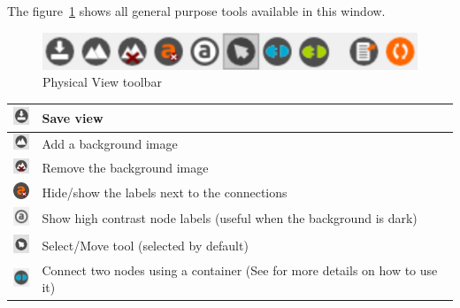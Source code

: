 \documentclass[a4paper]{article}
\begin{document}
		The figure~\ref{fig:default_view_toolbar} shows all general purpose tools available in this window.
		\begin{figure}[h!]
			\centering
			\includegraphics[width=0.6\linewidth]{img/default_view_toolbar.png}
			\caption{Physical View toolbar}
			\label{fig:default_view_toolbar}
		\end{figure}
		
		\begin{table}[h!]
			\centering
			\begin{tabular}[h!]{lp{10cm}}
				\includegraphics[width=0.5cm]{img/icon_save.png} & Save view\\
				\midrule
				\includegraphics[width=0.5cm]{img/icon_add_background.png} & Add a background image\\
				\midrule
				\includegraphics[width=0.5cm]{img/icon_remove_background.png} & Remove the background image\\
				\midrule
				\includegraphics[width=0.5cm]{img/icon_toggle_conn_labels.png} & Hide/show the labels next to the connections\\
				\midrule
				\includegraphics[width=0.5cm]{img/object_view_high_contrast.png} & Show high contrast node labels (useful when the background is dark)\\
				\midrule
				\includegraphics[width=0.5cm]{img/icon_select_tool.png} & Select/Move tool (selected by default)\\
				\midrule
				\includegraphics[width=0.5cm]{img/object_view_container.png} & Connect two nodes using a container (See \textbf{\nameref{sec:physical_connections}} for more details on how to use it)\\

\end{tabular}
\end{table}
\end{document}
